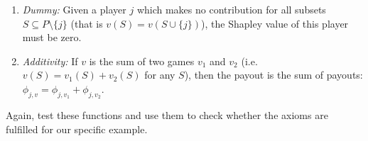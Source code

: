{\begin{enumerate}
\begin{enumerate}
        \item \textit{Dummy:} Given a player $j$ which makes no contribution for all subsets $S \subseteq P \setminus \{j\}$ (that is $v(S) = v(S \cup \{j\})$), the Shapley value of this player must be zero.
        
        \item \textit{Additivity:} If $v$ is the sum of two games $v_1$ and $v_2$ (i.e. $v(S) = v_1(S) + v_2(S)$ for any $S$), then the payout is the sum of payouts: $\phi_{j,v} = \phi_{j,v_1} + \phi_{j, v_2}$.
        
    \end{enumerate}
    
    Again, test these functions and use them to check whether the axioms are fulfilled for our specific example.
    
\end{enumerate}

}
